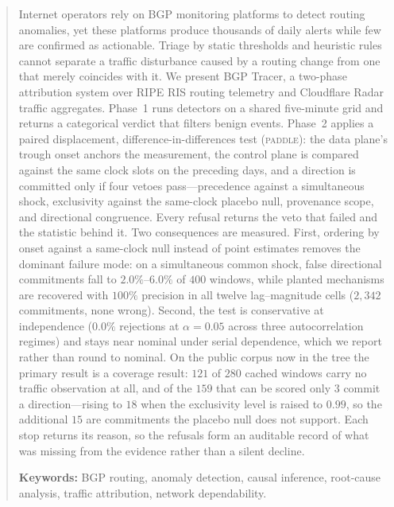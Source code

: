 \documentclass[sigconf,anonymous]{acmart}
\begin{document}
\begin{abstract}
Internet operators rely on BGP monitoring platforms to detect routing
anomalies, yet these platforms produce thousands of daily alerts while
few are confirmed as actionable. Triage by static thresholds and
heuristic rules cannot separate a traffic disturbance caused by a
routing change from one that merely coincides with it. We present BGP
Tracer, a two-phase attribution system over RIPE RIS routing telemetry
and Cloudflare Radar traffic aggregates. Phase~1 runs detectors on a
shared five-minute grid and returns a categorical verdict that filters
benign events. Phase~2 applies a paired displacement, difference-in-differences
test (\textsc{paddle}): the data plane's trough onset anchors the
measurement, the control plane is compared against the same clock slots on
the preceding days, and a direction is committed only if four vetoes
pass---precedence against a simultaneous shock, exclusivity against the
same-clock placebo null, provenance scope, and directional congruence.
Every refusal returns the veto that failed and the
statistic behind it. Two consequences are measured. First, ordering by
onset against a same-clock null instead of point estimates removes the
dominant failure mode: on a simultaneous common shock, false directional
commitments fall to $2.0\%$--$6.0\%$ of $400$ windows,
while planted mechanisms are recovered with $100\%$ precision in all
twelve lag--magnitude cells ($2{,}342$ commitments, none wrong).
Second, the test is conservative at independence ($0.0\%$ rejections at
$\alpha=0.05$ across three autocorrelation regimes) and stays near
nominal under serial dependence, which we report rather than
round to nominal. On the public corpus now in the tree the primary
result is a coverage result: $121$ of $280$ cached windows carry no
traffic observation at all, and of the $159$ that can be scored only $3$
commit a direction---rising to $18$ when the exclusivity level is raised
to $0.99$, so the additional $15$ are commitments the placebo null does
not support. Each stop returns
its reason, so the refusals form an auditable record of what was missing
from the evidence rather than a silent decline.



\vspace{1ex}
\noindent\textbf{Keywords:} BGP routing, anomaly detection, causal inference, root-cause analysis, traffic attribution, network dependability.
\end{abstract}
\maketitle















\appendix

\end{document}
